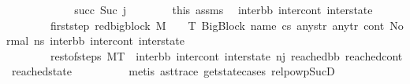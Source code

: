 \begin{isabellebody}
\ \ \ \ \isamarkupfalse%
\isanewline
\ \ \ \ \ \ \isamarkupfalse%
\ succ{\isacharunderscore}{\kern0pt}{}{\isacharcolon}{\kern0pt}\ {\isacharparenleft}{\kern0pt}Suc\ j{\isacharprime}{\kern0pt}{\isacharparenright}{\kern0pt}\isanewline
\ \ \ \ \ \ \isamarkupfalse%
\ this\ assms{\isacharparenleft}{\kern0pt}{}{\isacharparenright}{\kern0pt}\ \isamarkupfalse%
\ inter{\isacharunderscore}{\kern0pt}bb\ inter{\isacharunderscore}{\kern0pt}cont\ inter{\isacharunderscore}{\kern0pt}state\ \isanewline
\ \ \ \ \ \ \ \ first{\isacharunderscore}{\kern0pt}step{\isacharcolon}{\kern0pt}\ {\isachardoublequoteopen}red{\isacharunderscore}{\kern0pt}bigblock\ M\ {\isasymLambda}\ {\isasymGamma}\ {\isasymOmega}\ T\ {\isacharparenleft}{\kern0pt}{\isacharparenleft}{\kern0pt}BigBlock\ name\ cs{}\ any{\isacharunderscore}{\kern0pt}str\ any{\isacharunderscore}{\kern0pt}tr{\isacharparenright}{\kern0pt}{\isacharcomma}{\kern0pt}\ cont{}{\isacharcomma}{\kern0pt}\ {\isacharparenleft}{\kern0pt}Normal\ ns{}{\isacharparenright}{\kern0pt}{\isacharparenright}{\kern0pt}\ {\isacharparenleft}{\kern0pt}inter{\isacharunderscore}{\kern0pt}bb{\isacharcomma}{\kern0pt}\ inter{\isacharunderscore}{\kern0pt}cont{\isacharcomma}{\kern0pt}\ inter{\isacharunderscore}{\kern0pt}state{\isacharparenright}{\kern0pt}{\isachardoublequoteclose}\ \isanewline
\ \ \ \ \ \ \ \ rest{\isacharunderscore}{\kern0pt}of{\isacharunderscore}{\kern0pt}steps{\isacharcolon}{\kern0pt}\ {\isachardoublequoteopen}M{\isacharcomma}{\kern0pt}{\isasymLambda}{\isacharcomma}{\kern0pt}{\isasymGamma}{\isacharcomma}{\kern0pt}{\isasymOmega}{\isacharcomma}{\kern0pt}T\ {\isasymturnstile}\ {\isacharparenleft}{\kern0pt}inter{\isacharunderscore}{\kern0pt}bb{\isacharcomma}{\kern0pt}\ inter{\isacharunderscore}{\kern0pt}cont{\isacharcomma}{\kern0pt}\ inter{\isacharunderscore}{\kern0pt}state{\isacharparenright}{\kern0pt}\ {\isacharminus}{\kern0pt}n{\isasymlongrightarrow}{\isacharcircum}{\kern0pt}j{\isacharprime}{\kern0pt}\ {\isacharparenleft}{\kern0pt}reached{\isacharunderscore}{\kern0pt}bb{\isacharcomma}{\kern0pt}\ reached{\isacharunderscore}{\kern0pt}cont{\isacharcomma}{\kern0pt}\ reached{\isacharunderscore}{\kern0pt}state{\isacharparenright}{\kern0pt}{\isachardoublequoteclose}\isanewline
\ \ \ \ \ \ \ \ \isamarkupfalse%
\ {\isacharparenleft}{\kern0pt}metis\ ast{\isacharunderscore}{\kern0pt}trace\ get{\isacharunderscore}{\kern0pt}state{\isachardot}{\kern0pt}cases\ relpowp{\isacharunderscore}{\kern0pt}Suc{\isacharunderscore}{\kern0pt}D{}{\isacharparenright}{\kern0pt}\isanewline

\end{isabellebody}

